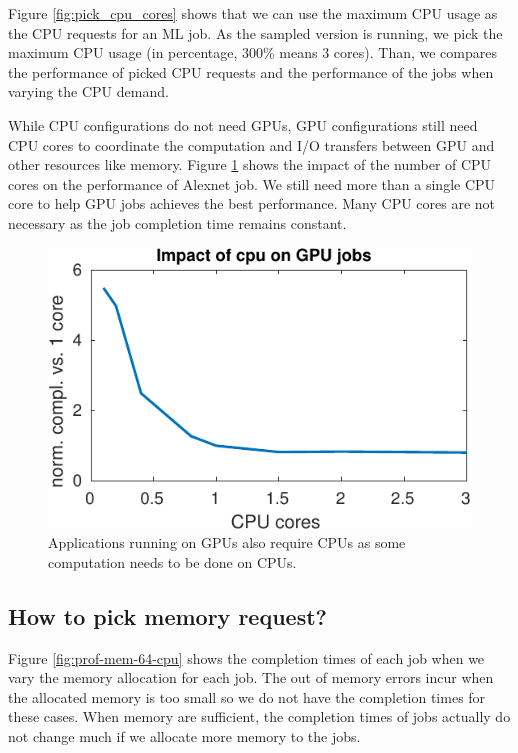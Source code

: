 Figure \ref{fig:pick_cpu_cores} shows that we can use the maximum CPU usage as the CPU requests for an ML job.
As the sampled version is running, we pick the maximum CPU usage (in percentage, 300\% means 3 cores).
Than, we compares the performance of picked CPU requests and the performance of the jobs when varying the CPU demand.

While CPU configurations do not need GPUs, GPU configurations still need CPU cores to coordinate the computation and I/O transfers between GPU and other resources like memory.
Figure \ref{fig:cpu_on_gpu} shows the impact of the number of CPU cores on the performance of Alexnet job. 
We still need more than a single CPU core to help GPU jobs achieves the best performance.
Many CPU cores are not necessary as the job completion time remains constant.

\begin{figure}[h]
	\centering
	\includegraphics[width=0.7\linewidth]{figs/cpu_on_gpu}
	\caption{Applications running on GPUs also require CPUs as some computation needs to be done on CPUs.}
	\label{fig:cpu_on_gpu}
\end{figure}

\subsection{How to pick memory request?}


Figure \ref{fig:prof-mem-64-cpu} shows the completion times of each job when we vary the memory allocation for each job.
The out of memory errors incur when the allocated memory is too small so we do not have the completion times for these cases.
When memory are sufficient, the completion times of jobs actually do not change much if we allocate more memory to the jobs.

